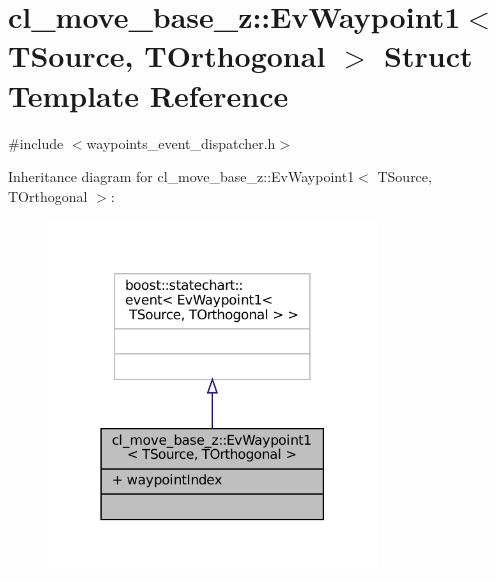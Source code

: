 \hypertarget{structcl__move__base__z_1_1EvWaypoint1}{}\section{cl\+\_\+move\+\_\+base\+\_\+z\+:\+:Ev\+Waypoint1$<$ T\+Source, T\+Orthogonal $>$ Struct Template Reference}
\label{structcl__move__base__z_1_1EvWaypoint1}


{\ttfamily \#include $<$waypoints\+\_\+event\+\_\+dispatcher.\+h$>$}



Inheritance diagram for cl\+\_\+move\+\_\+base\+\_\+z\+:\+:Ev\+Waypoint1$<$ T\+Source, T\+Orthogonal $>$\+:
\nopagebreak
\begin{figure}[H]
\begin{center}
\leavevmode
\includegraphics[width=247pt]{structcl__move__base__z_1_1EvWaypoint1__inherit__graph}
\end{center}
\end{figure}



